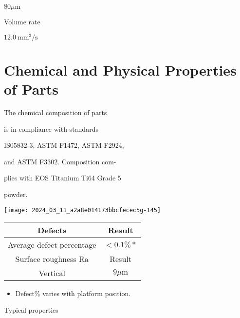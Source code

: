 \documentclass[10pt]{article}
\begin{document}
$80 \mu \mathrm{m}$

Volume rate

$12.0 \mathrm{~mm}^{3} / \mathrm{s}$

\section*{Chemical and Physical Properties of Parts}
The chemical composition of parts

is in compliance with standards

IS05832-3, ASTM F1472, ASTM F2924,

and ASTM F3302. Composition com-

plies with EOS Titanium Ti64 Grade 5

powder.

\begin{center}
\texttt{[image: 2024\_03\_11\_a2a8e014173bbcfecec5g-145]}
\end{center}

\begin{center}
\begin{tabular}{|c|c|}
\hline
Defects & Result \\
\hline
Average defect percentage & $<0.1 \% *$ \\
\hline
Surface roughness $\mathrm{Ra}$ & Result \\
\hline
Vertical & $9 \mu \mathrm{m}$ \\
\hline
\end{tabular}
\end{center}

\begin{itemize}
  \item Defect\% varies with platform position.
\end{itemize}

Typical properties
\end{document}
